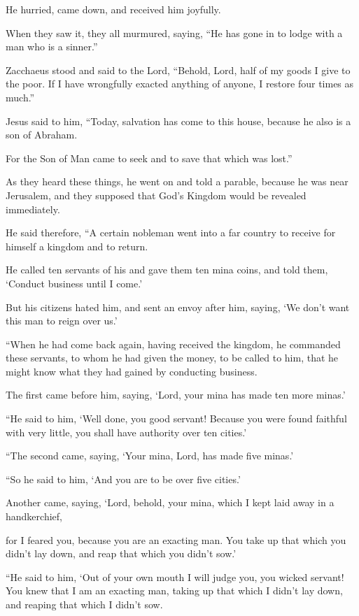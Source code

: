 He hurried, came down, and received him joyfully.

When they saw it, they all murmured, saying, “He has gone in to lodge with a man who is a sinner.”

Zacchaeus stood and said to the Lord, “Behold, Lord, half of my goods I give to the poor. If I have wrongfully exacted anything of anyone, I restore four times as much.”

Jesus said to him, “Today, salvation has come to this house, because he also is a son of Abraham.

For the Son of Man came to seek and to save that which was lost.”

As they heard these things, he went on and told a parable, because he was near Jerusalem, and they supposed that God’s Kingdom would be revealed immediately.

He said therefore, “A certain nobleman went into a far country to receive for himself a kingdom and to return.

He called ten servants of his and gave them ten mina coins,  and told them, ‘Conduct business until I come.’

But his citizens hated him, and sent an envoy after him, saying, ‘We don’t want this man to reign over us.’

“When he had come back again, having received the kingdom, he commanded these servants, to whom he had given the money, to be called to him, that he might know what they had gained by conducting business.

The first came before him, saying, ‘Lord, your mina has made ten more minas.’

“He said to him, ‘Well done, you good servant! Because you were found faithful with very little, you shall have authority over ten cities.’

“The second came, saying, ‘Your mina, Lord, has made five minas.’

“So he said to him, ‘And you are to be over five cities.’

Another came, saying, ‘Lord, behold, your mina, which I kept laid away in a handkerchief,

for I feared you, because you are an exacting man. You take up that which you didn’t lay down, and reap that which you didn’t sow.’

“He said to him, ‘Out of your own mouth I will judge you, you wicked servant! You knew that I am an exacting man, taking up that which I didn’t lay down, and reaping that which I didn’t sow.

